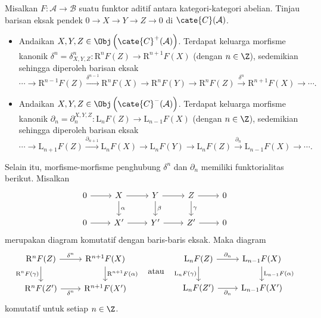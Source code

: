 \begin{teorema}\label{prop:long-exact-sequence-primer}
	Misalkan $F: \mathcal{A} \to \mathcal{B}$ suatu funktor aditif antara kategori-kategori abelian. Tinjau barisan eksak pendek $0 \to X \to Y \to Z \to 0$ di $\cate{C}(\mathcal{A})$.
	\begin{itemize}
		\item Andaikan $X, Y, Z \in \Obj\left(\cate{C}^+(\mathcal{A})\right)$. Terdapat keluarga morfisme kanonik $\delta^n = \delta^n_{X,Y,Z}: \mathrm{R}^n F(Z) \to \mathrm{R}^{n+1} F(X)$ (dengan $n \in \Z$), sedemikian sehingga diperoleh barisan eksak
		\[ \cdots \to \mathrm{R}^{n-1} F(Z) \xrightarrow{\delta^{n-1}} \mathrm{R}^n F(X) \to \mathrm{R}^n F(Y) \to \mathrm{R}^n F(Z) \xrightarrow{\delta^n} \mathrm{R}^{n+1} F(X) \to \cdots . \]
		\item Andaikan $X, Y, Z \in \Obj\left(\cate{C}^-(\mathcal{A})\right)$. Terdapat keluarga morfisme kanonik $\partial_n = \partial_n^{X,Y,Z}: \mathrm{L}_n F(Z) \to \mathrm{L}_{n-1} F(X)$ (dengan $n \in \Z$), sedemikian sehingga diperoleh barisan eksak
		\[ \cdots \to \mathrm{L}_{n+1} F(Z) \xrightarrow{\partial_{n+1}} \mathrm{L}_n F(X) \to \mathrm{L}_n F(Y) \to \mathrm{L}_n F(Z) \xrightarrow{\partial_n} \mathrm{L}_{n-1} F(X) \to \cdots . \]
	\end{itemize}
	Selain itu, morfisme-morfisme penghubung $\delta^n$ dan $\partial_n$ memiliki funktorialitas berikut. Misalkan
	\[\begin{tikzcd}
		0 \arrow[r] & X \arrow[d, "\alpha"] \arrow[r] & Y \arrow[d, "\beta"] \arrow[r] & Z \arrow[d, "\gamma"] \arrow[r] & 0 \\
		0 \arrow[r] & X' \arrow[r] & Y' \arrow[r] & Z' \arrow[r] & 0
	\end{tikzcd}\]
	merupakan diagram komutatif dengan baris-baris eksak. Maka diagram
	\[\begin{tikzcd}
		\mathrm{R}^n F(Z) \arrow[r, "{\delta^n}"] \arrow[d, "{\mathrm{R}^n F(\gamma)}"'] & \mathrm{R}^{n+1} F(X) \arrow[d, "{\mathrm{R}^{n+1} F(\alpha)}"] \\
		\mathrm{R}^n F(Z') \arrow[r, "{\delta^n}"'] & \mathrm{R}^{n+1} F(X')
	\end{tikzcd} \quad \text{atau} \quad
	\begin{tikzcd}
		\mathrm{L}_n F(Z) \arrow[r, "{\partial_n}"] \arrow[d, "{\mathrm{L}_n F(\gamma)}"'] & \mathrm{L}_{n-1} F(X) \arrow[d, "{\mathrm{L}_{n-1} F(\alpha)}"] \\
		\mathrm{L}_n F(Z') \arrow[r, "{\partial_n}"'] & \mathrm{L}_{n-1} F(X')
	\end{tikzcd}\]
	komutatif untuk setiap $n \in \Z$.
\end{teorema}
